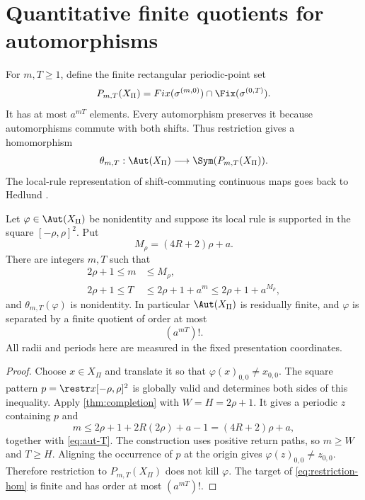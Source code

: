\section{Quantitative finite quotients for automorphisms}\label{sec:automorphisms}

For $m,T\geq1$, define the finite rectangular periodic-point set
\[
 P_{m,T}(X_\Pi)=Fix(\sigma^{(m,0)})\cap\Fix(\sigma^{(0,T)}).
\]
It has at most $a^{mT}$ elements.  Every automorphism preserves it because automorphisms commute with both shifts.  Thus restriction gives a homomorphism
\begin{equation}\label{eq:restriction-hom}
 \theta_{m,T}:\Aut(X_\Pi)\longrightarrow
 \Sym(P_{m,T}(X_\Pi)).
\end{equation}
The local-rule representation of shift-commuting continuous maps goes back to Hedlund \citep{hedlund1969}.

\begin{corollary}\label{cor:aut}
Let $\varphi\in\Aut(X_\Pi)$ be nonidentity and suppose its local rule is supported in the square $[-\rho,\rho]^2$.  Put
\[
 M_\rho=(4R+2)\rho+a.
\]
There are integers $m,T$ such that
\begin{align}
 2\rho+1\leq m&\leq M_\rho,\label{eq:aut-m}\\
 2\rho+1\leq T&\leq 2\rho+1+a^m
                    \leq2\rho+1+a^{M_\rho},\label{eq:aut-T}
\end{align}
and $\theta_{m,T}(\varphi)$ is nonidentity.  In particular
$\Aut(X_\Pi)$ is residually finite, and $\varphi$ is separated by a finite quotient of order at most
\[
 \left(a^{mT}\right)!.
\]
All radii and periods here are measured in the fixed presentation coordinates.
\end{corollary}

\begin{proof}
Choose $x\in X_\Pi$ and translate it so that
$\varphi(x)_{0,0}\neq x_{0,0}$.  The square pattern
$p=\restr x{[-\rho,\rho]^2}$ is globally valid and determines both sides of this inequality.  Apply \cref{thm:completion} with
$W=H=2\rho+1$.  It gives a periodic $z$ containing $p$ and
\[
 m\leq2\rho+1+2R(2\rho)+a-1=(4R+2)\rho+a,
\]
together with \eqref{eq:aut-T}.  The construction uses positive return paths, so $m\geq W$ and $T\geq H$.  Aligning the occurrence of $p$ at the origin gives
$\varphi(z)_{0,0}\neq z_{0,0}$.  Therefore restriction to
$P_{m,T}(X_\Pi)$ does not kill $\varphi$.  The target of
\eqref{eq:restriction-hom} is finite and has order at most $(a^{mT})!$.
\end{proof}

